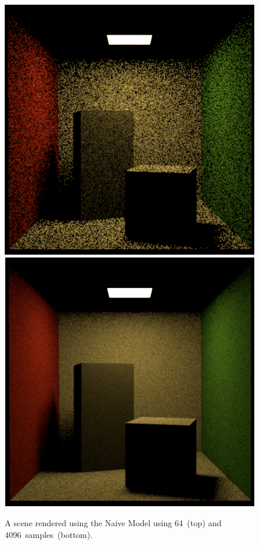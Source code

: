 \documentclass{article}
\begin{document}
\begin{figure}[p]
\centering
\includegraphics[width=.75\textwidth]{assets/naive64}
\\
\includegraphics[width=.75\textwidth]{assets/naive1024}

\caption{A scene rendered using the Naive Model using 64~(top) and 4096~samples~(bottom).}
\label{fig:naive_rendering}
\end{figure}
\end{document}
